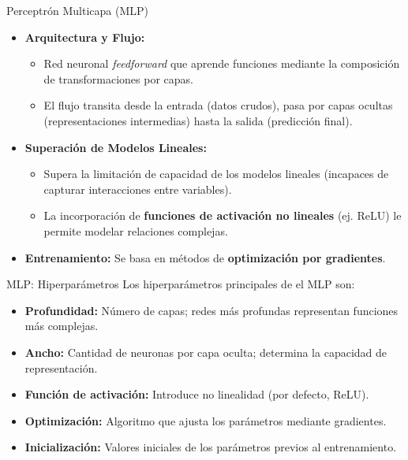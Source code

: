 \documentclass{beamer}
\begin{document}
\begin{frame}{Perceptrón Multicapa (MLP)}
\begin{itemize}
        \item \textbf{Arquitectura y Flujo:}
        \begin{itemize}
            \item Red neuronal \textit{feedforward} que aprende funciones mediante la composición de transformaciones por capas.
            \item El flujo transita desde la entrada (datos crudos), pasa por capas ocultas (representaciones intermedias) hasta la salida (predicción final).
        \end{itemize}
        
        \item \textbf{Superación de Modelos Lineales:}
        \begin{itemize}
            \item Supera la limitación de capacidad de los modelos lineales (incapaces de capturar interacciones entre variables).
            \item La incorporación de \textbf{funciones de activación no lineales} (ej. ReLU) le permite modelar relaciones complejas.
        \end{itemize}

        \item \textbf{Entrenamiento:} Se basa en métodos de \textbf{optimización por gradientes}.
    \end{itemize}
\end{frame}


\begin{frame}{MLP: Hiperparámetros}
    Los hiperparámetros principales de el MLP son:
    \begin{itemize}
        \item \textbf{Profundidad:} Número de capas; redes más profundas representan funciones más complejas.
        \item \textbf{Ancho:} Cantidad de neuronas por capa oculta; determina la capacidad de representación.
        \item \textbf{Función de activación:} Introduce no linealidad (por defecto, ReLU).
        \item \textbf{Optimización:} Algoritmo que ajusta los parámetros mediante gradientes.
        \item \textbf{Inicialización:} Valores iniciales de los parámetros previos al entrenamiento.
    \end{itemize} 
\end{frame}
\end{document}
